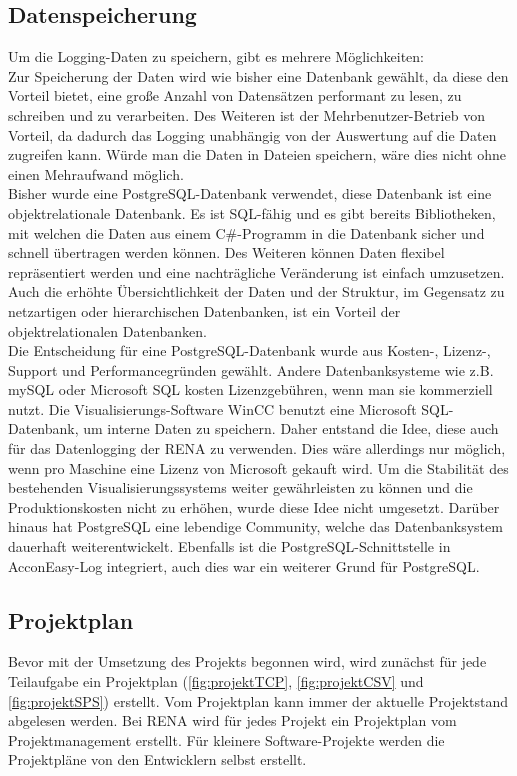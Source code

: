 \subsection{Datenspeicherung}
Um die Logging-Daten zu speichern, gibt es mehrere Möglichkeiten:
\ \\Zur Speicherung der Daten wird wie bisher eine Datenbank gewählt, da diese den Vorteil bietet, eine große Anzahl von Datensätzen performant zu lesen, zu schreiben und zu verarbeiten. Des Weiteren ist der Mehrbenutzer-Betrieb von Vorteil, da dadurch das Logging unabhängig von der Auswertung auf die Daten zugreifen kann. Würde man die Daten in Dateien speichern, wäre dies nicht ohne einen Mehraufwand möglich. 
\ \\Bisher wurde eine PostgreSQL-Datenbank verwendet, diese Datenbank ist eine objektrelationale Datenbank. Es ist SQL-fähig und es gibt bereits Bibliotheken, mit welchen die Daten aus einem C\#-Programm in die Datenbank sicher und schnell übertragen werden können. Des Weiteren können Daten flexibel repräsentiert werden und eine nachträgliche Veränderung ist einfach umzusetzen. Auch die erhöhte Übersichtlichkeit der Daten und der Struktur, im Gegensatz zu netzartigen oder hierarchischen Datenbanken, ist ein Vorteil der objektrelationalen Datenbanken.
\ \\Die Entscheidung für eine PostgreSQL-Datenbank wurde aus Kosten-, Lizenz-, Support und Performancegründen gewählt. Andere Datenbanksysteme wie z.B. mySQL oder Microsoft SQL kosten Lizenzgebühren, wenn man sie kommerziell nutzt. Die Visualisierungs-Software WinCC benutzt eine Microsoft SQL-Datenbank, um interne Daten zu speichern. Daher entstand die Idee, diese auch für das Datenlogging der RENA zu verwenden. Dies wäre allerdings nur möglich, wenn pro Maschine eine Lizenz von Microsoft gekauft wird. Um die Stabilität des bestehenden Visualisierungssystems weiter gewährleisten zu können und die Produktionskosten nicht zu erhöhen, wurde diese Idee nicht umgesetzt. Darüber hinaus hat PostgreSQL eine lebendige Community, welche das Datenbanksystem dauerhaft weiterentwickelt. Ebenfalls ist die PostgreSQL-Schnittstelle in AcconEasy-Log integriert, auch dies war ein weiterer Grund für PostgreSQL. 

\subsection{Projektplan}
Bevor mit der Umsetzung des Projekts begonnen wird, wird zunächst für jede Teilaufgabe ein Projektplan (\autoref{fig:projektTCP}, \autoref{fig:projektCSV} und \autoref{fig:projektSPS}) erstellt. Vom Projektplan kann immer der aktuelle Projektstand abgelesen werden. Bei RENA wird für jedes Projekt ein Projektplan vom Projektmanagement erstellt. Für kleinere Software-Projekte werden die Projektpläne von den Entwicklern selbst erstellt.

